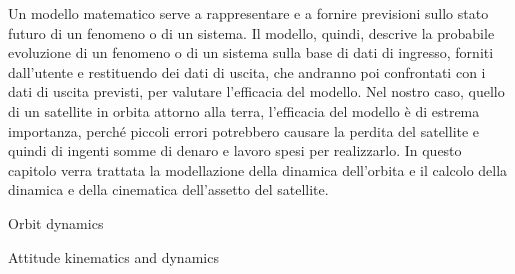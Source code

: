 Un modello matematico serve a rappresentare e a fornire previsioni sullo stato
futuro di un fenomeno o di un sistema. Il modello, quindi, descrive la probabile
evoluzione di un fenomeno o di un sistema sulla base di dati di ingresso,
forniti dall'utente e restituendo dei dati di uscita, che andranno poi
confrontati con i dati di uscita previsti, per valutare l'efficacia del modello.
Nel nostro caso, quello di un satellite in orbita attorno alla terra,
l'efficacia del modello è di estrema importanza, perché piccoli errori
potrebbero causare la perdita del satellite e quindi di ingenti somme di denaro
e lavoro spesi per realizzarlo. In questo capitolo verra trattata la
modellazione della dinamica dell'orbita e il calcolo della dinamica e della
cinematica dell'assetto del satellite.
\begin{section}{Orbit dynamics}

\end{section}
\begin{section}{Attitude kinematics and dynamics}

\end{section}